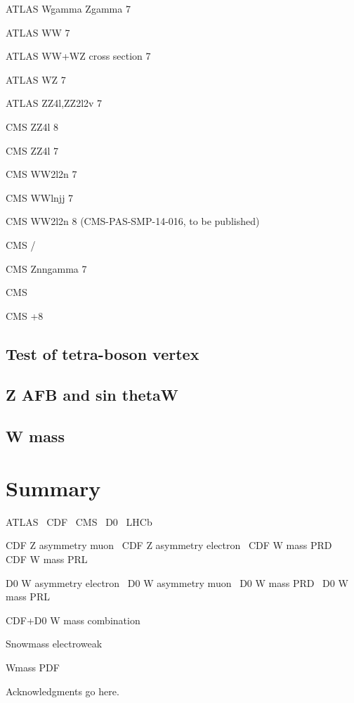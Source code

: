 \documentclass[12pt]{iopart}
\begin{document}
ATLAS Wgamma Zgamma 7 \TeV~\cite{Aad:2013izg}

ATLAS WW 7 \TeV~\cite{ATLAS:2012mec}

ATLAS WW+WZ cross section 7 \TeV~\cite{Aad:2014mda}

ATLAS WZ 7 \TeV~\cite{Aad:2012twa}

ATLAS ZZ4l,ZZ2l2v 7 \TeV~\cite{Aad:2012awa}

CMS ZZ4l 8 \TeV~\cite{Khachatryan:2014dia}

CMS ZZ4l 7 \TeV~\cite{Chatrchyan:2012sga}

CMS WW2l2n 7 \TeV~\cite{Chatrchyan:2013yaa}

CMS WWlnjj 7 \TeV~\cite{Chatrchyan:2012bd}

CMS WW2l2n 8 \TeV (CMS-PAS-SMP-14-016, to be published)

CMS \Wg/ \TeV~\cite{Chatrchyan:2013fya}

CMS Znngamma 7 \TeV~\cite{Chatrchyan:2013nda}

CMS  \TeV~\cite{Khachatryan:2015kea}

CMS +8 \TeV~\cite{Khachatryan:2015pba}

\subsection{Test of tetra-boson vertex}


\subsection{Z AFB and sin thetaW}


\subsection{W mass}

\section{Summary}


ATLAS~\cite{Aad:2008zzm}
CDF~\cite{Abulencia:2005ix}
CMS~\cite{CMSdetector}
D0~\cite{Abazov:2005pn}
LHCb~\cite{Alves:2008zz}

CDF Z asymmetry muon~\cite{Aaltonen:2014loa}
CDF Z asymmetry electron~\cite{Aaltonen:2013wcp}
CDF W mass PRD~\cite{Aaltonen:2013vwa}
CDF W mass PRL~\cite{Aaltonen:2012bp}

D0 W asymmetry electron~\cite{Abazov:2013dsa}
D0 W asymmetry muon~\cite{Abazov:2013rja}
D0 W mass PRD~\cite{D0:2013jba}
D0 W mass PRL~\cite{Abazov:2012bv}

CDF+D0 W mass combination~\cite{Aaltonen:2013iut}

Snowmass electroweak~\cite{Baak:2013fwa}

Wmass PDF~\cite{Bozzi:2011ww}

\ack
Acknowledgments go here.



\end{document}
